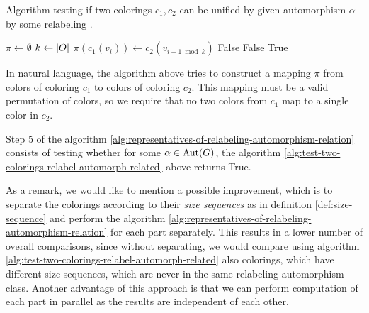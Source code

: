 \begin{algorithm}[H]
    \caption{Algorithm testing if two colorings $c_1, c_2$ can be unified by given automorphism $\alpha$ by some relabeling \pi.} 
    \begin{algorithmic}[1]
            \State $\pi \gets \emptyset$
                \State $k \gets \left|{O}\right|$
                            \State $\pi(c_1(v_i)) \gets c_2(v_{i + 1 \bmod k})$
                        \Else
                            \State \Return False
                        \EndIf
                    \Else
                            \State \Return False
                        \EndIf
                    \EndIf
                \EndFor
            \EndFor
            \State \Return True
        \EndFunction
    \end{algorithmic}
    \label{alg:test-two-colorings-relabel-automorph-related}
\end{algorithm}

In natural language, the algorithm above tries to construct a mapping $\pi$ from colors of coloring $c_1$ to colors of coloring $c_2$. This mapping must be a valid permutation of colors, so we require that no two colors from $c_1$ map to a single color in $c_2$.

Step $5$ of the algorithm \ref{alg:representatives-of-relabeling-automorphism-relation} consists of testing whether for some $\alpha \in \operatorname{Aut}(G)$, the algorithm \ref{alg:test-two-colorings-relabel-automorph-related} above returns True.

As a remark, we would like to mention a possible improvement, which is to separate the colorings according to their \textit{ size sequences} as in definition \ref{def:size-sequence} and perform the algorithm \ref{alg:representatives-of-relabeling-automorphism-relation} for each part separately. This results in a lower number of overall comparisons, since without separating, we would compare using algorithm \ref{alg:test-two-colorings-relabel-automorph-related} also colorings, which have different size sequences, which are never in the same relabeling-automorphism class. Another advantage of this approach is that we can perform computation of each part in parallel as the results are independent of each other.

